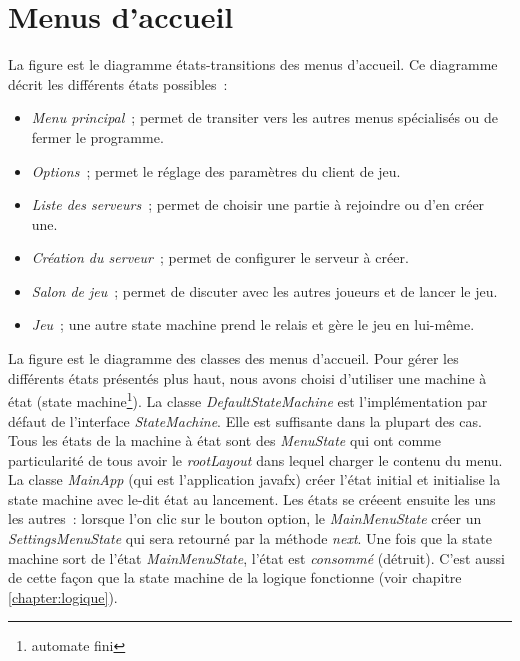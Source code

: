 \chapter{Menus d'accueil}\label{chapter:menu}

La figure  est le diagramme états-transitions des menus d'accueil.
Ce diagramme décrit les différents états possibles :
\begin{itemize}
    \item \emph{Menu principal} ; permet de transiter vers les autres menus spécialisés ou de fermer le programme.
    \item \emph{Options} ; permet le réglage des paramètres du client de jeu.
    \item \emph{Liste des serveurs} ; permet de choisir une partie à rejoindre ou d'en créer une.
    \item \emph{Création du serveur} ; permet de configurer le serveur à créer.
    \item \emph{Salon de jeu} ; permet de discuter avec les autres joueurs et de lancer le jeu.
    \item \emph{Jeu} ; une autre state machine prend le relais et gère le jeu en lui-même.
\end{itemize}


La figure  est le diagramme des classes des menus d'accueil.
Pour gérer les différents états présentés plus haut, nous avons choisi d'utiliser une machine à état
(state machine\footnote{automate fini}).
La classe \emph{DefaultStateMachine} est l'implémentation par défaut de l'interface \emph{StateMachine}.
Elle est suffisante dans la plupart des cas.
Tous les états de la machine à état sont des \emph{MenuState} qui ont comme particularité de tous avoir
le \emph{rootLayout} dans lequel charger le contenu du menu.
La classe \emph{MainApp} (qui est l'application javafx) créer l'état initial et initialise la state machine avec
le-dit état au lancement.
Les états se créeent ensuite les uns les autres : lorsque l'on clic sur le bouton option, le \emph{MainMenuState} créer un
\emph{SettingsMenuState} qui sera retourné par la méthode \emph{next}. Une fois que la state machine sort de l'état
\emph{MainMenuState}, l'état est \emph{consommé} (détruit). C'est aussi de cette façon que la state machine de
la logique fonctionne (voir chapitre \ref{chapter:logique}).


